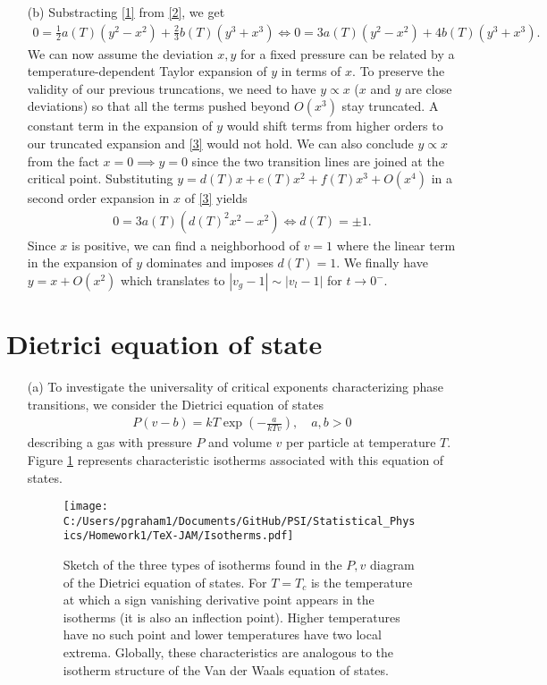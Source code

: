 \documentclass[10pt, a4paper]{article}
\begin{document}
{\begin{enumerate}
  \item[(b)] Substracting \eqref{1} from \eqref{2}, we get 
  \begin{align*}
    0 = \frac{1}{2}a(T) (y^2 - x^2) + \frac{2}{3}b(T) (y^3 + x^3) \iff 0 = 3a(T) (y^2 - x^2) + 4 b(T) (y^3 + x^3).  \tag{$\star\star\star$} \label{3}
  \end{align*}
  We can now assume the deviation $x, y$ for a fixed pressure can be related by a temperature-dependent Taylor expansion of $y$ in terms of $x$. To preserve the validity of our previous truncations, we need to have $y \propto x$ ($x$ and $y$ are close deviations) so that all the terms pushed beyond $O(x^3)$ stay truncated. A constant term in the expansion of $y$ would shift terms from higher orders to our truncated expansion and \eqref{3} would not hold. We can also conclude $y \propto x$ from the fact $x=0 \implies y=0$ since the two transition lines are joined at the critical point. Substituting $y = d(T) x + e(T) x^2 + f(T) x^3 + O(x^4)$ in a second order expansion in $x$ of \eqref{3} yields 
  \begin{align*}
    0 = 3a(T) (d(T)^2 x^2 - x^2) \iff d(T) = \pm 1. 
  \end{align*}
  Since $x$ is positive, we can find a neighborhood of $v=1$ where the linear term in the expansion of $y$ dominates and imposes $d(T) = 1$. We finally have $y = x + O(x^2)$ which translates to $|v_g-1| \sim |v_l-1|$ for $t \to 0^-$.
\end{enumerate}

\section{Dietrici equation of state}
\begin{enumerate}
  \item[(a)] To investigate the universality of critical exponents characterizing phase transitions, we consider the Dietrici equation of states 
  \begin{align*}
    P(v-b) = kT \exp\left(-\frac{a}{kT v}\right), \quad a, b > 0
  \end{align*} 
  describing a gas with pressure $P$ and volume $v$ per particle at temperature $T$. Figure \ref{f1} represents characteristic isotherms associated with this equation of states. 

  \begin{figure}[h!]
    \centering
    \texttt{[image: C:/Users/pgraham1/Documents/GitHub/PSI/Statistical\_Physics/Homework1/TeX-JAM/Isotherms.pdf]}
    \caption{\label{f1} Sketch of the three types of isotherms found in the $P, v$ diagram of the Dietrici equation of states. For $T=T_c$ is the temperature at which a sign vanishing derivative point appears in the isotherms (it is also an inflection point). Higher temperatures have no such point and lower temperatures have two local extrema. Globally, these characteristics are analogous to the isotherm structure of the Van der Waals equation of states.}
  \end{figure}


\end{enumerate}}
\end{document}
